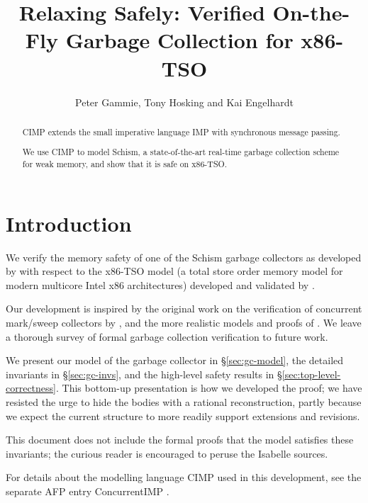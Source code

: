 \documentclass[11pt,a4paper]{article}
\begin{document}
\title{Relaxing Safely: Verified On-the-Fly Garbage Collection for x86-TSO}
\author{Peter Gammie, Tony Hosking and Kai Engelhardt}
\maketitle

\begin{abstract}
  CIMP extends the small imperative language IMP with synchronous
  message passing.

  We use CIMP to model Schism, a state-of-the-art real-time garbage
  collection scheme for weak memory, and show that it is safe on
  x86-TSO.
\end{abstract}

\tableofcontents

\section{Introduction}
\label{sec:introduction}

We verify the memory safety of one of the Schism garbage collectors as
developed by \citet{Pizlo+2010PLDI,Pizlo201xPhd} with respect to the
x86-TSO model (a total store order memory model for modern multicore
Intel x86 architectures) developed and validated by
\citet{DBLP:journals/cacm/SewellSONM10}.

Our development is inspired by the original work on the verification
of concurrent mark/sweep collectors by
\citet{DBLP:journals/cacm/DijkstraLMSS78}, and the more realistic
models and proofs of \citet{DBLP:conf/popl/DoligezG94}. We leave a
thorough survey of formal garbage collection verification to future
work.

We present our model of the
garbage collector in \S\ref{sec:gc-model}, the detailed invariants in
\S\ref{sec:gc-invs}, and the high-level safety results in
\S\ref{sec:top-level-correctness}. This bottom-up presentation is how
we developed the proof; we have resisted the urge to hide the bodies
with a rational reconstruction, partly because we expect the current
structure to more readily support extensions and revisions.

This document does not include the formal proofs that the model
satisfies these invariants; the curious reader is encouraged to peruse
the Isabelle sources.

For details about the modelling language CIMP used in this development,
see the separate AFP entry ConcurrentIMP \citep{ConcurrentIMP_AFP}.






\end{document}
